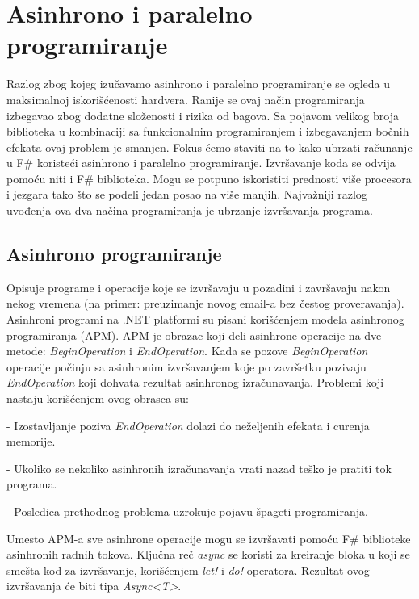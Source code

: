 \documentclass[a4paper]{article}
\begin{document}
\section{Asinhrono i paralelno programiranje}

Razlog zbog kojeg izučavamo asinhrono i paralelno programiranje se ogleda u maksimalnoj iskorišćenosti hardvera. Ranije se ovaj način programiranja izbegavao zbog dodatne složenosti i rizika od bagova. Sa pojavom velikog broja biblioteka u kombinaciji sa funkcionalnim programiranjem i izbegavanjem bočnih efekata ovaj problem je smanjen. Fokus ćemo staviti na to kako ubrzati računanje u F\# koristeći asinhrono i paralelno programiranje. Izvršavanje koda se odvija pomoću niti i F\# biblioteka. Mogu se potpuno iskoristiti prednosti više procesora i jezgara tako što se podeli jedan posao na više manjih. Najvažniji razlog uvođenja ova dva načina programiranja je ubrzanje izvršavanja programa.


\subsection{Asinhrono programiranje} 

Opisuje programe i operacije koje se izvršavaju u pozadini i završavaju nakon nekog vremena (na primer: preuzimanje novog email-a bez čestog proveravanja). Asinhroni programi na .NET platformi su pisani korišćenjem modela asinhronog programiranja (APM)\cite{apm}. APM je obrazac koji deli asinhrone operacije na dve metode: {\em BeginOperation} i {\em EndOperation}. Kada se pozove {\em BeginOperation} operacije počinju sa asinhronim izvršavanjem koje po završetku pozivaju {\em EndOperation} koji dohvata rezultat asinhronog izračunavanja. Problemi koji nastaju korišćenjem ovog obrasca su: 

	- Izostavljanje poziva {\em EndOperation} dolazi do neželjenih efekata i curenja memorije. 
 
	- Ukoliko se nekoliko asinhronih izračunavanja vrati nazad teško je pratiti tok programa.
	
	- Posledica prethodnog problema uzrokuje pojavu špageti programiranja.

Umesto APM-a sve asinhrone operacije mogu se izvršavati pomoću F\# biblioteke asinhronih radnih tokova\cite{progFs}. Ključna reč {\em async} se koristi za kreiranje bloka u koji se smešta kod za izvršavanje, korišćenjem {\em let!} i {\em do!} operatora. Rezultat ovog izvršavanja će biti tipa {\em Async<T>}\cite{progFs}.
\end{document}

